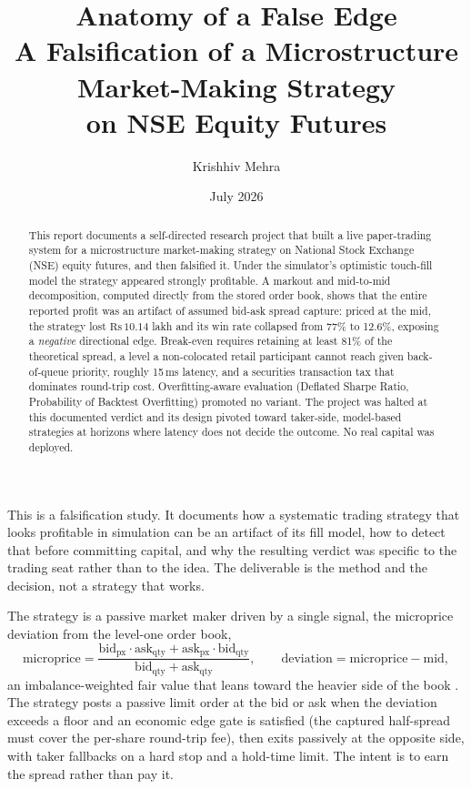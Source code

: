 \documentclass[11pt]{article}
\title{\vspace{-3.5em}\textbf{\LARGE Anatomy of a False Edge}\\[0.35em]
\normalsize\normalfont A Falsification of a Microstructure Market-Making Strategy\\ on NSE Equity Futures}
\author{Krishhiv Mehra}
\date{July 2026}
\makeatletter
\renewcommand\section{\@startsection{section}{1}{\z@}{1.4em}{0.5em}{\normalfont\large\bfseries\color{slate}}}
\newcommand{\rs}{\text{Rs}\,}
\makeatother
\begin{document}
\maketitle
\thispagestyle{empty}

\begin{abstract}
\noindent This report documents a self-directed research project that built a live
paper-trading system for a microstructure market-making strategy on National Stock
Exchange (NSE) equity futures, and then falsified it. Under the simulator's optimistic
touch-fill model the strategy appeared strongly profitable. A markout and mid-to-mid
decomposition, computed directly from the stored order book, shows that the entire
reported profit was an artifact of assumed bid-ask spread capture: priced at the mid,
the strategy lost $\rs 10.14$ lakh and its win rate collapsed from 77\% to 12.6\%,
exposing a \emph{negative} directional edge. Break-even requires retaining at least
81\% of the theoretical spread, a level a non-colocated retail participant cannot reach
given back-of-queue priority, roughly 15\,ms latency, and a securities transaction tax
that dominates round-trip cost. Overfitting-aware evaluation (Deflated Sharpe Ratio,
Probability of Backtest Overfitting) promoted no variant. The project was halted at this
documented verdict and its design pivoted toward taker-side, model-based strategies at
horizons where latency does not decide the outcome. No real capital was deployed.
\end{abstract}

\vspace{0.5em}
{\small\tableofcontents}
\thispagestyle{empty}
\newpage

\section{Introduction and motivation}

This is a falsification study. It documents how a systematic trading strategy that looks
profitable in simulation can be an artifact of its fill model, how to detect that before
committing capital, and why the resulting verdict was specific to the trading seat rather
than to the idea. The deliverable is the method and the decision, not a strategy that works.

The strategy is a passive market maker driven by a single signal, the microprice deviation
from the level-one order book,
\[
\text{microprice} = \frac{\text{bid}_{\text{px}}\cdot\text{ask}_{\text{qty}} + \text{ask}_{\text{px}}\cdot\text{bid}_{\text{qty}}}{\text{bid}_{\text{qty}}+\text{ask}_{\text{qty}}},
\qquad
\text{deviation} = \text{microprice} - \text{mid},
\]
an imbalance-weighted fair value that leans toward the heavier side of the book \cite{stoikov}.
The strategy posts a passive limit order at the bid or ask when the deviation exceeds a floor
and an economic edge gate is satisfied (the captured half-spread must cover the per-share
round-trip fee), then exits passively at the opposite side, with taker fallbacks on a hard
stop and a hold-time limit. The intent is to earn the spread rather than pay it.
\end{document}
